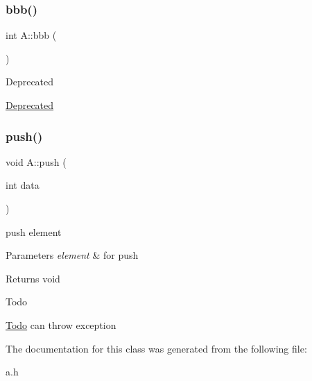 \subsubsection{\texorpdfstring{bbb()}{bbb()}}
{\footnotesize\ttfamily int A\+::bbb (\begin{DoxyParamCaption}{ }\end{DoxyParamCaption})}

\begin{DoxyRefDesc}{Deprecated}
\item[\hyperlink{deprecated__deprecated000002}{Deprecated}]\end{DoxyRefDesc}
\mbox{\label{classA_af7bc5cf93b098b333d88a1d52080a604}} 
\subsubsection{\texorpdfstring{push()}{push()}}
{\footnotesize\ttfamily void A\+::push (\begin{DoxyParamCaption}\item[{int}]{data }\end{DoxyParamCaption})}



push element 


\begin{DoxyParams}{Parameters}
{\em element} & for push\\
\hline
\end{DoxyParams}
\begin{DoxyReturn}{Returns}
void
\end{DoxyReturn}
\begin{DoxyRefDesc}{Todo}
\item[\hyperlink{todo__todo000001}{Todo}]can throw exception \end{DoxyRefDesc}


The documentation for this class was generated from the following file\+:\begin{DoxyCompactItemize}
\item 
a.\+h\end{DoxyCompactItemize}
